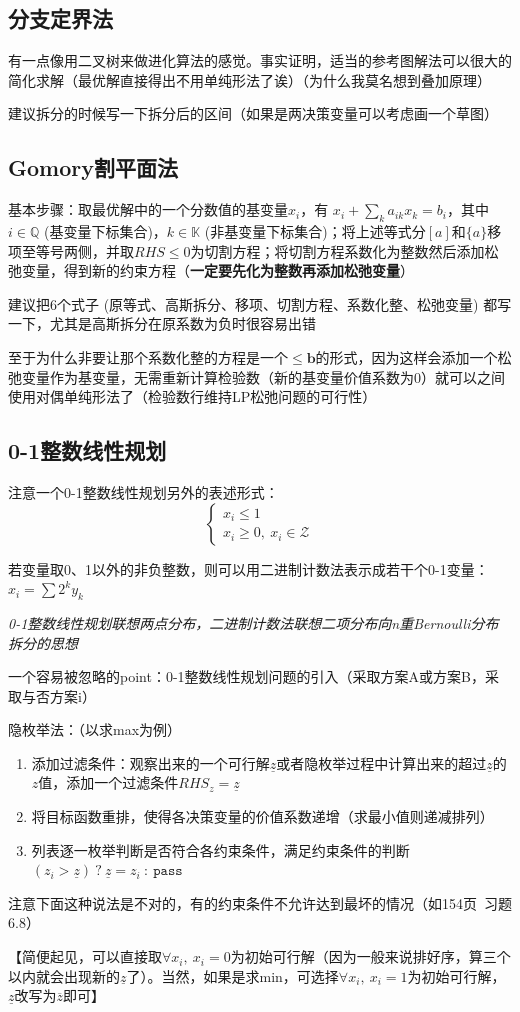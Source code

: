 \documentclass[]{report}
\begin{document}
		\subsection{分支定界法}
		有一点像用二叉树来做进化算法的感觉。事实证明，适当的参考图解法可以很大的简化求解（最优解直接得出不用单纯形法了诶）（为什么我莫名想到叠加原理）\par
		建议拆分的时候写一下拆分后的区间（如果是两决策变量可以考虑画一个草图）
		\subsection{Gomory割平面法}
		基本步骤：取最优解中的一个分数值的基变量$x_i$，有 $x_i+\sum_ka_{ik}x_k=b_i$，其中 $i\in \mathbb{Q}$ (基变量下标集合)，$k\in \mathbb{K}$ (非基变量下标集合)；将上述等式分$[a]$和$\{a\}$移项至等号两侧，并取$RHS\le 0$为切割方程；将切割方程系数化为整数然后添加松弛变量，得到新的约束方程（\textbf{一定要先化为整数再添加松弛变量}）\par
		建议把6个式子 (原等式、高斯拆分、移项、切割方程、系数化整、松弛变量) 都写一下，尤其是高斯拆分在原系数为负时很容易出错\par
		至于为什么非要让那个系数化整的方程是一个$\le\boldsymbol{b}$的形式，因为这样会添加一个松弛变量作为基变量，无需重新计算检验数（新的基变量价值系数为0）就可以之间使用对偶单纯形法了（检验数行维持LP松弛问题的可行性）
		\subsection{0-1整数线性规划}
		注意一个0-1整数线性规划另外的表述形式：
		\[\begin{cases}
			x_i\le 1\\
			x_i\ge0,\ x_i\in\mathcal{Z}
		\end{cases}\]\par
		若变量取0、1以外的非负整数，则可以用二进制计数法表示成若干个0-1变量：$x_i=\sum2^ky_k$\par
		\textit{0-1整数线性规划联想两点分布，二进制计数法联想二项分布向n重Bernoulli分布拆分的思想}\par
		一个容易被忽略的point：0-1整数线性规划问题的引入（采取方案A或方案B，采取与否方案i）\par
		隐枚举法：（以求max为例）\par
		\begin{enumerate}
			\item 添加过滤条件：观察出来的一个可行解$\underline{z}$或者隐枚举过程中计算出来的超过$\underline{z}$的$z$值，添加一个过滤条件$RHS_z=\underline{z}$
			\item 将目标函数重排，使得各决策变量的价值系数递增（求最小值则递减排列）
			\item 列表逐一枚举判断是否符合各约束条件，满足约束条件的判断$(z_i>\underline{z})\ ?\ \underline{z}=z_i\ :\ \mathtt{pass}$
		\end{enumerate}\par
		注意下面这种说法是不对的，有的约束条件不允许达到最坏的情况（如154页\ 习题6.8）\par
		【简便起见，可以直接取$\forall x_i,\ x_i=0$为初始可行解（因为一般来说排好序，算三个以内就会出现新的$\underline{z}$了）。当然，如果是求min，可选择$\forall x_i,\ x_i=1$为初始可行解，$\underline{z}$改写为$\overline{z}$即可】
\end{document}
